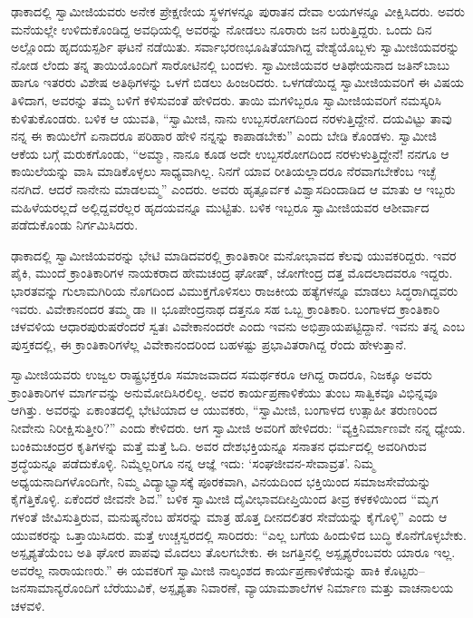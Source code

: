 ಢಾಕಾದಲ್ಲಿ ಸ್ವಾಮೀಜಿಯವರು ಅನೇಕ ಪ್ರೇಕ್ಷಣೀಯ ಸ್ಥಳಗಳನ್ನೂ ಪುರಾತನ ದೇವಾ ಲಯಗಳನ್ನೂ ವೀಕ್ಷಿಸಿದರು. ಅವರು ಮನೆಯಲ್ಲೇ ಉಳಿದುಕೊಂಡಿದ್ದ ಅವಧಿಯಲ್ಲಿ ಅವರನ್ನು ನೋಡಲು ನೂರಾರು ಜನ ಬರುತ್ತಿದ್ದರು. ಒಂದು ದಿನ ಅಲ್ಲೊಂದು ಹೃದಯಸ್ಪರ್ಶಿ ಘಟನೆ ನಡೆಯಿತು. ಸರ್ವಾಭರಣಭೂಷಿತೆಯಾಗಿದ್ದ ವೇಶ್ಯೆಯೊಬ್ಬಳು ಸ್ವಾಮೀಜಿಯವರನ್ನು ನೋಡ ಲೆಂದು ತನ್ನ ತಾಯಿಯೊಂದಿಗೆ ಸಾರೋಟಿನಲ್ಲಿ ಬಂದಳು. ಸ್ವಾಮೀಜಿಯವರ ಆತಿಥೇಯನಾದ ಜತಿನ್​ಬಾಬು ಹಾಗೂ ಇತರರು ವಿಶೇಷ ಅತಿಥಿಗಳನ್ನು ಒಳಗೆ ಬಿಡಲು ಹಿಂಜರಿದರು. ಒಳಗಡೆಯಿದ್ದ ಸ್ವಾಮೀಜಿಯವರಿಗೆ ಈ ವಿಷಯ ತಿಳಿದಾಗ, ಅವರನ್ನು ತಮ್ಮ ಬಳಿಗೆ ಕಳಿಸುವಂತೆ ಹೇಳಿದರು. ತಾಯಿ ಮಗಳಿಬ್ಬರೂ ಸ್ವಾಮೀಜಿಯವರಿಗೆ ನಮಸ್ಕರಿಸಿ ಕುಳಿತುಕೊಂಡರು. ಬಳಿಕ ಆ ಯುವತಿ, “ಸ್ವಾಮೀಜಿ, ನಾನು ಉಬ್ಬಸರೋಗದಿಂದ ನರಳುತ್ತಿದ್ದೇನೆ. ದಯವಿಟ್ಟು ತಾವು ನನ್ನ ಈ ಕಾಯಿಲೆಗೆ ಏನಾದರೂ ಪರಿಹಾರ ಹೇಳಿ ನನ್ನನ್ನು ಕಾಪಾಡಬೇಕು” ಎಂದು ಬೇಡಿ ಕೊಂಡಳು. ಸ್ವಾಮೀಜಿ ಆಕೆಯ ಬಗ್ಗೆ ಮರುಕಗೊಂಡು, “ಅಮ್ಮಾ, ನಾನೂ ಕೂಡ ಅದೇ ಉಬ್ಬಸರೋಗದಿಂದ ನರಳುಳುತ್ತಿದ್ದೇನೆ! ನನಗೂ ಆ ಕಾಯಿಲೆಯನ್ನು ವಾಸಿ ಮಾಡಿಕೊಳ್ಳಲು ಸಾಧ್ಯವಾಗಿಲ್ಲ. ನಿನಗೆ ಯಾವ ರೀತಿಯಲ್ಲಾದರೂ ನೆರವಾಗಬೇಕೆಂಬ ಇಚ್ಛೆ ನನಗಿದೆ. ಆದರೆ ನಾನೇನು ಮಾಡಲಮ್ಮ” ಎಂದರು. ಅವರು ಹೃತ್ಪೂರ್ವಕ ವಿಶ್ವಾಸದಿಂದಾಡಿದ ಆ ಮಾತು ಆ ಇಬ್ಬರು ಮಹಿಳೆಯರಲ್ಲದೆ ಅಲ್ಲಿದ್ದವರೆಲ್ಲರ ಹೃದಯವನ್ನೂ ಮುಟ್ಟಿತು. ಬಳಿಕ ಇಬ್ಬರೂ ಸ್ವಾಮೀಜಿಯವರ ಆಶೀರ್ವಾದ ಪಡೆದುಕೊಂಡು ನಿರ್ಗಮಿಸಿದರು.

ಢಾಕಾದಲ್ಲಿ ಸ್ವಾಮೀಜಿಯವರನ್ನು ಭೇಟಿ ಮಾಡಿದವರಲ್ಲಿ ಕ್ರಾಂತಿಕಾರೀ ಮನೋಭಾವದ ಕೆಲವು ಯುವಕರಿದ್ದರು. ಇವರ ಪೈಕಿ, ಮುಂದೆ ಕ್ರಾಂತಿಕಾರಿಗಳ ನಾಯಕರಾದ ಹೇಮಚಂದ್ರ ಘೋಷ್, ಜೋಗೇಂದ್ರ ದತ್ತ ಮೊದಲಾದವರೂ ಇದ್ದರು. ಭಾರತವನ್ನು ಗುಲಾಮಗಿರಿಯ ನೊಗದಿಂದ ವಿಮುಕ್ತಗೊಳಿಸಲು ರಾಜಕೀಯ ಹತ್ಯೆಗಳನ್ನೂ ಮಾಡಲು ಸಿದ್ಧರಾಗಿದ್ದವರು ಇವರು. ವಿವೇಕಾನಂದರ ತಮ್ಮ ಡಾ ॥ ಭೂಪೇಂದ್ರನಾಥ ದತ್ತನೂ ಸಹ ಒಬ್ಬ ಕ್ರಾಂತಿಕಾರಿ. ಬಂಗಾಳದ ಕ್ರಾಂತಿಕಾರಿ ಚಳವಳಿಯ ಆಧಾರಪುರುಷರೆಂದರೆ ಸ್ವತಃ ವಿವೇಕಾನಂದರೇ ಎಂದು ಇವನು ಅಭಿಪ್ರಾಯಪಟ್ಟಿದ್ದಾನೆ. ಇವನು ತನ್ನ  ಎಂಬ ಪುಸ್ತಕದಲ್ಲಿ, ಈ ಕ್ರಾಂತಿಕಾರಿಗಳೆಲ್ಲ ವಿವೇಕಾನಂದರಿಂದ ಬಹಳಷ್ಟು ಪ್ರಭಾವಿತರಾಗಿದ್ದ ರೆಂದು ಹೇಳುತ್ತಾನೆ.

ಸ್ವಾಮೀಜಿಯವರು ಉಜ್ವಲ ರಾಷ್ಟ್ರಭಕ್ತರೂ ಸಮಾಜವಾದದ ಸಮರ್ಥಕರೂ ಆಗಿದ್ದ ರಾದರೂ, ನಿಜಕ್ಕೂ ಅವರು ಕ್ರಾಂತಿಕಾರಿಗಳ ಮಾರ್ಗವನ್ನು ಅನುಮೋದಿಸಿರಲಿಲ್ಲ. ಅವರ ಕಾರ್ಯಪ್ರಣಾಳಿಕೆಯು ತುಂಬ ಸಾತ್ವಿಕವೂ ವಿಭಿನ್ನವೂ ಆಗಿತ್ತು. ಅವರನ್ನು ಏಕಾಂತದಲ್ಲಿ ಭೇಟಿಯಾದ ಆ ಯುವಕರು, “ಸ್ವಾಮೀಜಿ, ಬಂಗಾಳದ ಉತ್ಸಾಹೀ ತರುಣರಿಂದ ನೀವೇನು ನಿರೀಕ್ಷಿಸುತ್ತೀರಿ?” ಎಂದು ಕೇಳಿದರು. ಆಗ ಸ್ವಾಮೀಜಿ ಅವರಿಗೆ ಹೇಳಿದರು: “ವ್ಯಕ್ತಿನಿರ್ಮಾಣವೇ ನನ್ನ ಧ್ಯೇಯ. ಬಂಕಿಮಚಂದ್ರರ ಕೃತಿಗಳನ್ನು ಮತ್ತೆ ಮತ್ತೆ ಓದಿ. ಅವರ ದೇಶಭಕ್ತಿಯನ್ನೂ ಸನಾತನ ಧರ್ಮದಲ್ಲಿ ಅವರಿಗಿರುವ ಶ್ರದ್ಧೆಯನ್ನೂ ಪಡೆದುಕೊಳ್ಳಿ. ನಿಮ್ಮೆಲ್ಲರಿಗೂ ನನ್ನ ಆಜ್ಞೆ ಇದು: ‘ಸಂಘಜೀವನ-ಸೇವಾವ್ರತ’. ನಿಮ್ಮ ಅಧ್ಯಯನಾದಿಗಳೊಂದಿಗೇ, ನಿಮ್ಮ ವಿದ್ಯಾಭ್ಯಾಸಕ್ಕೆ ಪೂರಕವಾಗಿ, ವಿನಯದಿಂದ ಭಕ್ತಿಯಿಂದ ಸಮಾಜಸೇವೆಯನ್ನು ಕೈಗೆತ್ತಿಕೊಳ್ಳಿ. ಏಕೆಂದರೆ ಜೀವನೇ ಶಿವ.” ಬಳಿಕ ಸ್ವಾಮೀಜಿ ದೈವೀಭಾವದೀಪ್ತಿಯಿಂದ ತೀವ್ರ ಕಳಕಳಿಯಿಂದ “ಮೃಗ ಗಳಂತೆ ಜೀವಿಸುತ್ತಿರುವ, ಮನುಷ್ಯನೆಂಬ ಹೆಸರನ್ನು ಮಾತ್ರ ಹೊತ್ತ ದೀನದಲಿತರ ಸೇವೆಯನ್ನು ಕೈಗೊಳ್ಳಿ” ಎಂದು ಆ ಯುವಕರನ್ನು ಒತ್ತಾಯಿಸಿದರು. ಮತ್ತೆ ಉಚ್ಚಸ್ವರದಲ್ಲಿ ಸಾರಿದರು: “ಎಲ್ಲ ಬಗೆಯ ಹಿಂದುಳಿದ ಬುದ್ಧಿ ಕೊನೆಗೊಳ್ಳಬೇಕು. ಅಸ್ಪೃಶ್ಯತೆಯೆಂಬ ಅತಿ ಘೋರ ಪಾಪವು ಮೊದಲು ತೊಲಗಬೇಕು. ಈ ಜಗತ್ತಿನಲ್ಲಿ ಅಸ್ಪೃಶ್ಯರೆಂಬವರು ಯಾರೂ ಇಲ್ಲ. ಅವರೆಲ್ಲ ನಾರಾಯಣರು.” ಈ ಯವಕರಿಗೆ ಸ್ವಾಮೀಜಿ ನಾಲ್ಕಂಶದ ಕಾರ್ಯಪ್ರಣಾಳಿಕೆಯನ್ನು ಹಾಕಿ ಕೊಟ್ಟರು–ಜನಸಾಮಾನ್ಯರೊಂದಿಗೆ ಬೆರೆಯುವಿಕೆ, ಅಸ್ಪೃಶ್ಯತಾ ನಿವಾರಣೆ, ವ್ಯಾಯಾಮಶಾಲೆಗಳ ನಿರ್ಮಾಣ ಮತ್ತು ವಾಚನಾಲಯ ಚಳವಳಿ.


